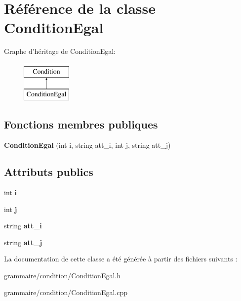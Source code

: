 \hypertarget{class_condition_egal}{\section{Référence de la classe Condition\-Egal}
\label{class_condition_egal}
}
Graphe d'héritage de Condition\-Egal\-:\begin{figure}[H]
\begin{center}
\leavevmode
\includegraphics[height=2.000000cm]{class_condition_egal}
\end{center}
\end{figure}
\subsection*{Fonctions membres publiques}
\begin{DoxyCompactItemize}
\item 
\hypertarget{class_condition_egal_aca81c458365e1f76926d4be512612d4c}{{\bfseries Condition\-Egal} (int i, string att\-\_\-i, int j, string att\-\_\-j)}\label{class_condition_egal_aca81c458365e1f76926d4be512612d4c}

\end{DoxyCompactItemize}
\subsection*{Attributs publics}
\begin{DoxyCompactItemize}
\item 
\hypertarget{class_condition_egal_aeeee1cf74f01d9c42db0766b7e079668}{int {\bfseries i}}\label{class_condition_egal_aeeee1cf74f01d9c42db0766b7e079668}

\item 
\hypertarget{class_condition_egal_ae42bac38695763ad892b5c74e8d3b24f}{int {\bfseries j}}\label{class_condition_egal_ae42bac38695763ad892b5c74e8d3b24f}

\item 
\hypertarget{class_condition_egal_ae597fea6bf77fca3ba1e4d2d7a9d0e5d}{string {\bfseries att\-\_\-i}}\label{class_condition_egal_ae597fea6bf77fca3ba1e4d2d7a9d0e5d}

\item 
\hypertarget{class_condition_egal_a260aa94c917366bf38af15eaf8c46ade}{string {\bfseries att\-\_\-j}}\label{class_condition_egal_a260aa94c917366bf38af15eaf8c46ade}

\end{DoxyCompactItemize}


La documentation de cette classe a été générée à partir des fichiers suivants \-:\begin{DoxyCompactItemize}
\item 
grammaire/condition/Condition\-Egal.\-h\item 
grammaire/condition/Condition\-Egal.\-cpp\end{DoxyCompactItemize}
